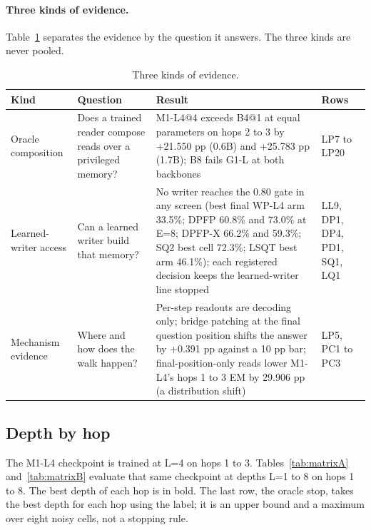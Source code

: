 \begin{table}[htbp]
\centering\footnotesize
\caption{Costs of the same readers: parameters, persistent state, and measured time per question (memory-only protocol, batch of 16 episodes).  %
}
\label{tab:maincost}
\gtMainCost
\end{table}

\paragraph{Three kinds of evidence.}
Table~\ref{tab:kinds} separates the evidence by the question it answers.
The three kinds are never pooled.

\begin{table}[htbp]
\centering\small
\caption{Three kinds of evidence.}
\label{tab:kinds}
\begin{tabular}{@{}p{2.4cm}p{3.2cm}p{7.2cm}p{1.9cm}@{}}
\toprule
Kind & Question & Result & Rows \\
\midrule
Oracle composition & Does a trained reader compose reads over a privileged memory? & M1-L4@4 exceeds B4@1 at equal parameters on hops 2 to 3 by +21.550 pp (0.6B) and +25.783 pp (1.7B); B8 fails G1-L at both backbones & LP7 to LP20 \\
Learned-writer access & Can a learned writer build that memory? & No writer reaches the 0.80 gate in any screen (best final WP-L4 arm 33.5\%; DPFP 60.8\% and 73.0\% at E=8; DPFP-X 66.2\% and 59.3\%; SQ2 best cell 72.3\%; LSQT best arm 46.1\%); each registered decision keeps the learned-writer line stopped & LL9, DP1, DP4, PD1, SQ1, LQ1 \\
Mechanism evidence & Where and how does the walk happen? & Per-step readouts are decoding only; bridge patching at the final question position shifts the answer by +0.391 pp against a 10 pp bar; final-position-only reads lower M1-L4's hops 1 to 3 EM by 29.906 pp (a distribution shift) & LP5, PC1 to PC3 \\
\bottomrule
\end{tabular}
\end{table}

\subsection{Depth by hop}
\label{sec:depth-hop}

The M1-L4 checkpoint is trained at L=4 on hops 1 to 3.
Tables~\ref{tab:matrixA} and~\ref{tab:matrixB} evaluate that same checkpoint at depths L=1 to 8 on hops 1 to 8.
The best depth of each hop is in bold.
The last row, the oracle stop, takes the best depth for each hop using the label; it is an upper bound and a maximum over eight noisy cells, not a stopping rule.  %

